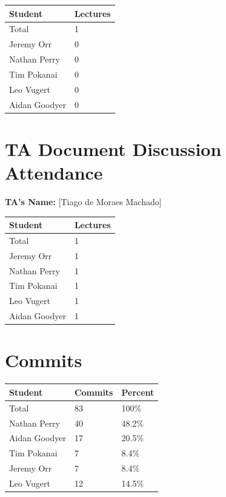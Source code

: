 \documentclass{article}
\begin{document}
\begin{table}[H]
\centering
\begin{tabular}{ll}
\toprule
\textbf{Student} & \textbf{Lectures}\\
\midrule
Total & 1\\
Jeremy Orr & 0\\
Nathan Perry & 0\\
Tim Pokanai & 0\\
Leo Vugert & 0\\
Aidan Goodyer & 0\\
\bottomrule
\end{tabular}
\end{table}

\section{TA Document Discussion Attendance}

\noindent \textbf{TA's Name: } [Tiago de Moraes Machado]

\begin{table}[H]
\centering
\begin{tabular}{ll}
\toprule
\textbf{Student} & \textbf{Lectures}\\
\midrule
Total & 1\\
Jeremy Orr & 1\\
Nathan Perry & 1\\
Tim Pokanai & 1\\
Leo Vugert & 1\\
Aidan Goodyer & 1\\
\bottomrule
\end{tabular}
\end{table}

\section{Commits}

\begin{table}[H]
\centering
\begin{tabular}{lll}
\toprule
\textbf{Student} & \textbf{Commits} & \textbf{Percent}\\
\midrule
Total & 83 & 100\% \\
Nathan Perry & 40 & 48.2\% \\
Aidan Goodyer & 17 & 20.5\% \\
Tim Pokanai & 7 & 8.4\% \\
Jeremy Orr & 7 & 8.4\% \\
Leo Vugert & 12 & 14.5\% \\
\bottomrule
\end{tabular}
\end{table}
\end{document}

